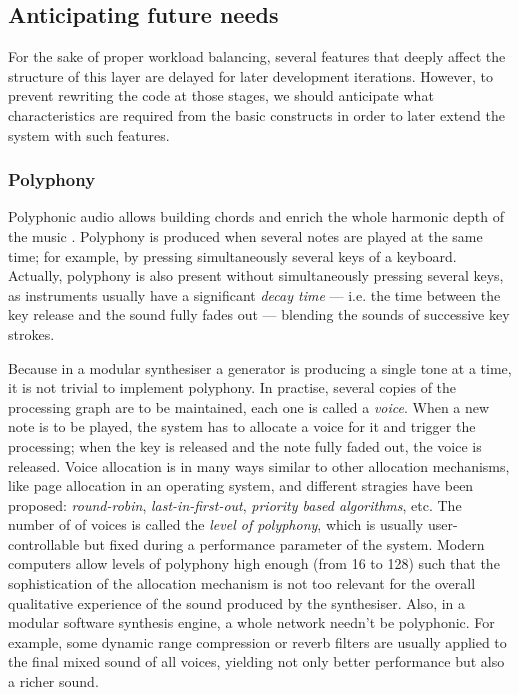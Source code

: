 \subsection{Anticipating future needs}

For the sake of proper workload balancing, several features that
deeply affect the structure of this layer are delayed for later
development iterations. However, to prevent rewriting the code at
those stages, we should anticipate what characteristics are
required from the basic constructs in order to later extend the system
with such features.

\subsubsection{Polyphony}

Polyphonic audio allows building chords and enrich
the whole harmonic depth of the music
\cite{johnson02measured}. Polyphony is produced when several notes are
played at the same time; for example, by pressing simultaneously
several keys of a keyboard. Actually, polyphony is also present
without simultaneously pressing several keys, as instruments usually
have a significant \emph{decay time} ---
i.e. the time between the key release and the sound fully fades out
--- blending the sounds of successive key strokes.

Because in a modular synthesiser a generator is producing a single
tone at a time, it is not trivial to implement polyphony. In practise,
several copies of the processing graph are to be maintained, each one
is called a \emph{voice}. When a new note is
to be played, the system has to allocate a voice for it and trigger
the processing; when the key is released and the note fully faded out,
the voice is released. Voice allocation is in many ways similar to
other allocation mechanisms, like page allocation in an operating
system, and different stragies have been proposed: \emph{round-robin},
\emph{last-in-first-out}, \emph{priority based algorithms}, etc. The
number of of voices is called the \emph{level of polyphony}, which is
usually user-controllable but fixed during a performance parameter of
the system. Modern computers allow levels of polyphony
high enough (from 16 to 128) such that the sophistication of the
allocation mechanism is not too relevant for the overall qualitative
experience of the sound produced by the synthesiser. Also, in a
modular software synthesis engine, a whole network needn't be
polyphonic. For example, some dynamic range compression or reverb
filters are usually applied to the final mixed sound of all voices,
yielding not only better performance but also a richer sound.

